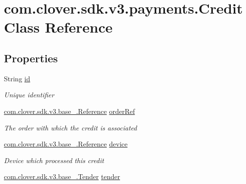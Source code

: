 \hypertarget{classcom_1_1clover_1_1sdk_1_1v3_1_1payments_1_1_credit}{}\section{com.\+clover.\+sdk.\+v3.\+payments.\+Credit Class Reference}
\label{classcom_1_1clover_1_1sdk_1_1v3_1_1payments_1_1_credit}
\subsection*{Properties}
\begin{DoxyCompactItemize}
\item 
String \hyperlink{classcom_1_1clover_1_1sdk_1_1v3_1_1payments_1_1_credit_af296ad7778f74b1ea14fe35908f04a5f}{id}
\begin{DoxyCompactList}\small\item\em Unique identifier \end{DoxyCompactList}\item 
\hyperlink{classcom_1_1clover_1_1sdk_1_1v3_1_1base___1_1_reference}{com.\+clover.\+sdk.\+v3.\+base\+\_\+.\+Reference} \hyperlink{classcom_1_1clover_1_1sdk_1_1v3_1_1payments_1_1_credit_a9d21d88484689700b810d02c67aad2d4}{order\+Ref}
\begin{DoxyCompactList}\small\item\em The order with which the credit is associated \end{DoxyCompactList}\item 
\hyperlink{classcom_1_1clover_1_1sdk_1_1v3_1_1base___1_1_reference}{com.\+clover.\+sdk.\+v3.\+base\+\_\+.\+Reference} \hyperlink{classcom_1_1clover_1_1sdk_1_1v3_1_1payments_1_1_credit_acefc7cd9b1508f9c1d6b27f1f172da73}{device}
\begin{DoxyCompactList}\small\item\em Device which processed this credit \end{DoxyCompactList}\item 
\hyperlink{classcom_1_1clover_1_1sdk_1_1v3_1_1base___1_1_tender}{com.\+clover.\+sdk.\+v3.\+base\+\_\+.\+Tender} \hyperlink{classcom_1_1clover_1_1sdk_1_1v3_1_1payments_1_1_credit_a68a74f3bcbf20225574fcd709d579415}{tender}

\end{DoxyCompactItemize}
